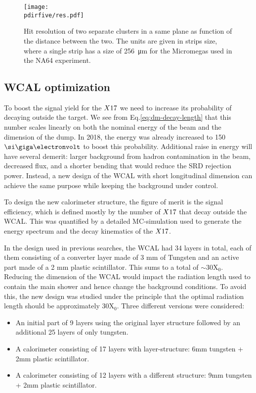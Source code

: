 \begin{figure}[tbh!]
  \centering
  \texttt{[image: \\pdirfive/res.pdf]}
  \caption[Hit resolution as function of the two cluster distance]{Hit resolution of two separate clusters in a same plane as function of the distance between the two. The units are given in strips size, where a single strip has a size of \SI{256}{\micro\meter} for the Micromegas used in the NA64 experiment.}
  \label{fig:res-hit}
\end{figure}

\subsection{WCAL optimization}
\label{ch5:sec:new-vismode-setup-wcal}

To boost the signal yield for the $X17$ we need to increase its probability of decaying outside the target. We see from Eq.\ref{eq:dm-decay-length} that this number scales linearly on both the nominal energy of the beam and the dimension of the dump. In 2018, the energy was already increased to 150 $\gev$ to boost this probability. Additional raise in energy will have several demerit: larger background from hadron contamination in the beam, decreased flux, and a shorter bending that would reduce the SRD rejection power. Instead, a new design of the WCAL with short longitudinal dimension can achieve the same purpose while keeping the background under control.

To design the new calorimeter structure, the figure of merit is the signal efficiency, which is defined mostly by the number of $X17$ that decay outside the WCAL. This was quantified by a detailed MC-simulation used to generate the energy spectrum and the decay kinematics of the $X17$.

In the design used in previous searches, the WCAL had 34 layers in total, each of them consisting of a converter layer made of 3 mm of Tungsten and an active part made of a 2 mm plastic scintillator. This sums to a total of $\sim$30X$_0$. Reducing the dimension of the WCAL would impact the radiation length used to contain the main shower and hence change the background conditions. To avoid this, the new design was studied under the principle that the optimal radiation length should be approximately 30X$_0$. Three different versions were considered:

\begin{itemize}
\item An initial part of 9 layers using the original layer structure followed by an additional 25 layers of only tungsten.
\item A calorimeter consisting of 17 layers with layer-structure: 6mm tungsten + 2mm plastic scintillator.
\item A calorimeter consisting of 12 layers with a different structure: 9mm tungsten + 2mm plastic scintillator.
\end{itemize}

